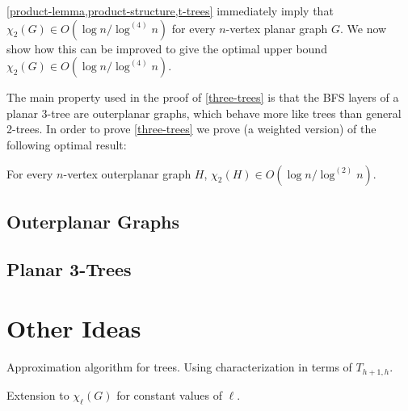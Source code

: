 \documentclass[kpfonts]{patmorin}
\newcommand{\uqs}{\chi_2}
\theoremstyle{named}
\begin{document}
\cref{product-lemma,product-structure,t-trees} immediately imply that $\uqs(G)\in O(\log n/\log^{(4)} n)$ for every $n$-vertex planar graph $G$.  We now show how this can be improved to give the optimal upper bound
$\uqs(G)\in O(\log n/\log^{(4)} n)$.

%

The main property used in the proof of \cref{three-trees} is that the BFS layers of a planar 3-tree are outerplanar graphs, which behave more like trees than general 2-trees.  In order to prove \cref{three-trees} we prove (a weighted version) of the following optimal result:

\begin{thm}
For every $n$-vertex outerplanar graph $H$, $\uqs(H)\in O(\log n/\log^{(2)} n)$.
\end{thm}

\subsection{Outerplanar Graphs}


\subsection{Planar 3-Trees}


\section{Other Ideas}

Approximation algorithm for trees.  Using characterization in terms of $T_{h+1,h}$.

Extension to $\chi_\ell(G)$ for constant values of $\ell$.




\end{document}
